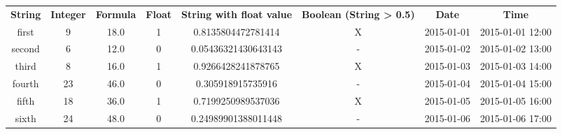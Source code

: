 \begin{tabular}{c|c|c|c|c|c|c|c|}
\textbf{String} & \textbf{Integer} & \textbf{Formula} & \textbf{Float} & \textbf{String with float value} & \textbf{Boolean (String \textgreater{} 0.5)} & \textbf{Date} & \textbf{Time}\\
first & 9 & 18.0 & 1 & 0.8135804472781414 & X & 2015-01-01 & 2015-01-01 12:00\\
second & 6 & 12.0 & 0 & 0.05436321430643143 & - & 2015-01-02 & 2015-01-02 13:00\\
third & 8 & 16.0 & 1 & 0.9266428241878765 & X & 2015-01-03 & 2015-01-03 14:00\\
fourth & 23 & 46.0 & 0 & 0.305918915735916 & - & 2015-01-04 & 2015-01-04 15:00\\
fifth & 18 & 36.0 & 1 & 0.7199250989537036 & X & 2015-01-05 & 2015-01-05 16:00\\
sixth & 24 & 48.0 & 0 & 0.24989901388011448 & - & 2015-01-06 & 2015-01-06 17:00
\end{tabular}